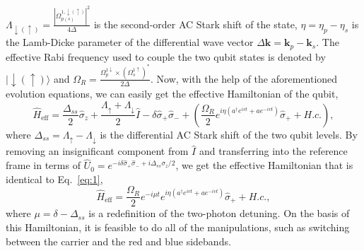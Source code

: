 $\Lambda_{\downarrow(\uparrow)}=\frac{\left|\Omega_{p(s)}^{1, \downarrow(\uparrow)}\right|^2}{4 \Delta}$ is the second-order AC Stark shift of the state, $\eta=\eta_p-\eta_s$ is the Lamb-Dicke parameter of the differential wave vector $\Delta \mathbf{k}=\mathbf{k}_p-\mathbf{k}_s$. The effective Rabi frequency used to couple the two qubit states is denoted by $|\downarrow(\uparrow)\rangle$ and $\Omega_R=\frac{\Omega^{1\downarrow}_p \times (\Omega^{1\uparrow}_s)^*}{2\Delta}$. Now, with the help of the aforementioned evolution equations, we can easily get the effective Hamiltonian of the qubit,
\begin{equation}
    \hat{H}_{\mathrm{eff}}=\frac{\Delta_{s s}}{2} \hat{\sigma}_z+\frac{\Lambda_{\uparrow}+\Lambda_{\downarrow}}{2} \hat{I}-\delta \hat{\sigma}_{+} \hat{\sigma}_{-}+\left(\frac{\Omega_R}{2} e^{i \eta\left(a^{\dagger} e^{i v t}+a e^{-i v t}\right)} \hat{\sigma}_{+}+H . c .\right),
\end{equation}
where $\Delta_{ss}=\Lambda_{\uparrow}-\Lambda_{\downarrow}$ is the differential AC Stark shift of the two qubit levels. By removing an insignificant component from $\hat{I}$ and transferring into the reference frame in terms of $\hat{U}_0=e^{-i\delta\hat{\sigma}_+\hat{\sigma}_-+i\Delta_{ss}\sigma_z/2}$, we get the effective Hamiltonian that is identical to Eq.~\eqref{eq:1},
\begin{equation}
    \hat{H}_{\mathrm{eff}}=\frac{\Omega_R}{2} e^{-i \mu t} e^{i \eta\left(a^{\dagger} e^{i v t}+a e^{-i v t}\right)} \hat{\sigma}_{+}+H . c .,
\end{equation}
where $\mu=\delta-\Delta_{ss}$ is a redefinition of the two-photon detuning. On the basis of this Hamiltonian, it is feasible to do all of the manipulations, such as switching between the carrier and the red and blue sidebands.
